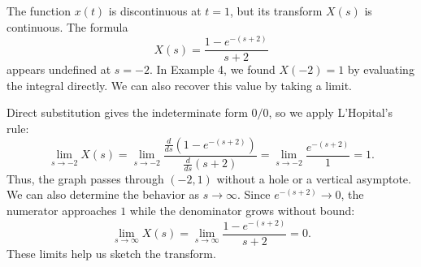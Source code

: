 \documentclass[10pt,letterpaper]{article}
\begin{document}
The function $x(t)$ is discontinuous at $t=1$, but its
transform $X(s)$ is continuous. The formula
\[
X(s)=\frac{1-e^{-(s+2)}}{s+2}
\]
appears undefined at $s=-2$. In Example 4, we found
$X(-2)=1$ by evaluating the integral directly.
We can also recover this value by taking a limit.

Direct substitution gives the indeterminate form $0/0$,
so we apply L'Hopital's rule:
\[
\lim_{s\to-2}X(s)
=
\lim_{s\to-2}\frac{\tfrac{d}{ds}(1-e^{-(s+2)})}{\tfrac{d}{ds}(s+2)}
=
\lim_{s\to-2}\frac{e^{-(s+2)}}{1}
=1.
\]
Thus, the graph passes through $(-2,1)$ without a hole
or a vertical asymptote. We can also determine the behavior as $s\to\infty$.
Since $e^{-(s+2)}\to0$, the numerator approaches $1$
while the denominator grows without bound:
\[
\lim_{s\to\infty}X(s)
=
\lim_{s\to\infty}\frac{1-e^{-(s+2)}}{s+2}
=0.
\]
These limits help us sketch the transform.
\end{document}
